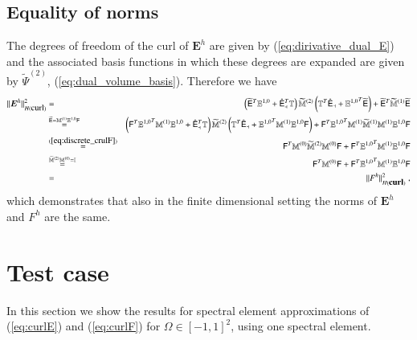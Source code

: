 \documentclass[graybox]{svmult}
\begin{document}
\subsection{Equality of norms}\label{sec:equivalent_norms}
The degrees of freedom of the curl of $\bm{E}^h$ are given by (\ref{eq:dirivative_dual_E}) and the associated basis functions in which these degrees are expanded are given by $\widetilde{\Psi}^{(2)}$, (\ref{eq:dual_volume_basis}).
Therefore we have
\begin{eqnarray*}
\| \bm{E}^h\|_{H(\mbox{curl})}^2 & = & \left (\widetilde{\mathsf{E}}^T \mathbb{E}^{1,0} +  \hat{\mathsf{E}}_{\dashv}^T \mathbb{T} \right ) \widetilde{\mathbb{M}}^{(2)} \left (\mathbb{T}^T {\hat{\mathsf{E}}_{\dashv}} + {\mathbb{E}^{1,0}}^T \widetilde{\mathsf{E}} \right ) + \widetilde{\mathsf{E}} ^T\widetilde{\mathbb{M}}^{(1)} \widetilde{\mathsf{E}} \\
 & \stackrel{\widetilde{\mathsf{E}}=\mathbb{M}^{(1)}\mathbb{E}^{1,0}\mathsf{F}}{=} & \left (\mathsf{F}^T {\mathbb{E}^{1,0}}^T \mathbb{M}^{(1)}\mathbb{E}^{1,0} +  \hat{\mathsf{E}}_{\dashv}^T \mathbb{T} \right ) \widetilde{\mathbb{M}}^{(2)} \left ( \mathbb{T}^T {\hat{\mathsf{E}}_{\dashv}} + {\mathbb{E}^{1,0}}^T \mathbb{M}^{(1)} \mathbb{E}^{1,0} \mathsf{F} \right ) + \mathsf{F}^T {\mathbb{E}^{1,0}}^T \mathbb{M}^{(1)} \widetilde{\mathbb{M}}^{(1)} \mathbb{M}^{(1)} \mathbb{E}^{1,0} \mathsf{F} \\
 & \stackrel{(\ref{eq:discrete_crulF})}{=} &  \mathsf{F}^T \mathbb{M}^{(0)} \widetilde{\mathbb{M}}^{(2)} \mathbb{M}^{(0)} \mathsf{F} + \mathsf{F}^T {\mathbb{E}^{1,0}}^T \mathbb{M}^{(1)} \mathbb{E}^{1,0} \mathsf{F} \\
 & \stackrel{\widetilde{\mathbb{M}}^{(2)} \mathbb{M}^{(0)}=\mathbb{I}}{=} &  \mathsf{F}^T \mathbb{M}^{(0)} \mathsf{F} + \mathsf{F}^T {\mathbb{E}^{1,0}}^T \mathbb{M}^{(1)} \mathbb{E}^{1,0} \mathsf{F} \\
 & = &   \| F^h\|_{H(\mbox{\bf{curl}})}^2 \;,
\end{eqnarray*}
which demonstrates that also in the finite dimensional setting the norms of $\bm{E}^h$ and $F^h$ are the same.

\section{Test case} \label{sec:Results}
In this section we show the results for spectral element approximations of (\ref{eq:curlE}) and (\ref{eq:curlF}) for $\Omega \in [-1,1]^2$, using one spectral element.
\end{document}
